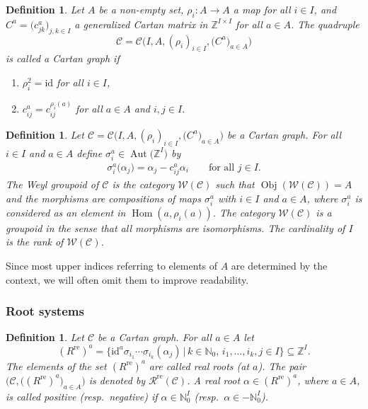 \documentclass[pdftex]{sigma}
\numberwithin{equation}{section}
\newtheorem{Definition}[Theorem]{Definition}
\newcommand{\NN }{\mathbb{N}}
\newcommand{\ZZ }{\mathbb{Z}}
\newcommand{\id }{\mathrm{id}}
\DeclareMathOperator{\Aut}{Aut}
\DeclareMathOperator{\Hom}{Hom}
\newcommand{\Cc }{\mathcal{C}}
\newcommand{\Wg }{\mathcal{W}}
\newcommand{\rsC }{\mathcal{R}}
\newcommand{\re }{^\mathrm{re}}
\newcommand{\rer }[1]{(R\re)^{#1}}
\DeclareMathOperator{\Obj}{Obj}
\begin{document}
\begin{Definition}
Let $A$ be a non-empty set, $\rho_i\colon A \to A$ a map for all $i\in I$, and $C^a=\big(c^a_{jk}\big)_{j,k \in I}$ a generalized Cartan matrix in $\ZZ ^{I \times I}$ for all $a\in A$. The quadruple
\[ \Cc = \Cc \big(I,A,(\rho_i)_{i \in I}, \big(C ^a\big)_{a \in A}\big) \]
is called a {\it Cartan graph} if
\begin{enumerate}\itemsep=0pt
\item[(C1)] $\rho_i^2 = \id$ for all $i \in I$,
\item[(C2)] $c^a_{ij} = c^{\rho_i(a)}_{ij}$ for all $a\in A$ and $i,j\in I$.
\end{enumerate}
\end{Definition}

\begin{Definition}
Let $\Cc = \Cc \big(I,A,(\rho_i)_{i \in I}, \big(C ^a\big)_{a \in A}\big)$ be a Cartan graph.
For all $i \in I$ and $a \in A$ define $\sigma _i^a \in \Aut\big(\ZZ ^I\big)$ by
\begin{align*}
\sigma _i^a \big(\alpha_j\big) = \alpha_j - c_{ij}^a \alpha_i \qquad
\text{for all $j \in I$.}
\end{align*}
The {\it Weyl groupoid of} $\Cc $ is the category $\Wg (\Cc )$ such that $\Obj(\Wg (\Cc ))=A$ and
the morphisms are compositions of maps $\sigma _i^a$ with $i\in I$ and $a\in A$,
where $\sigma _i^a$ is considered as an element in $\Hom (a,\rho_i(a))$.
The category $\Wg (\Cc )$ is a groupoid in the sense that all morphisms are isomorphisms.
The cardinality of $I$ is the {\it rank of} $\Wg (\Cc )$.
\end{Definition}

Since most upper indices referring to elements of $A$ are determined by the context, we will often omit them to improve readability.

\subsubsection{Root systems}

\begin{Definition}
Let $\Cc $ be a Cartan graph. For all $a\in A$ let
\[ \rer a=\big\{ \id ^a \sigma _{i_1}\cdots \sigma_{i_k}(\alpha_j)\,|\,
k\in \NN _0,\,i_1,\dots,i_k,j\in I\big\}\subseteq \ZZ ^I.\]
The elements of the set $\rer a$ are called {\it real roots} (at $a$).
The pair $\big(\Cc ,\big(\rer a\big)_{a\in A}\big)$ is denoted by $\rsC \re (\Cc )$.
A real root $\alpha\in \rer a$, where $a\in A$, is called positive
(resp.\ negative) if $\alpha\in \NN _0^I$ (resp.\ $\alpha\in -\NN _0^I$).
\end{Definition}
\end{document}
